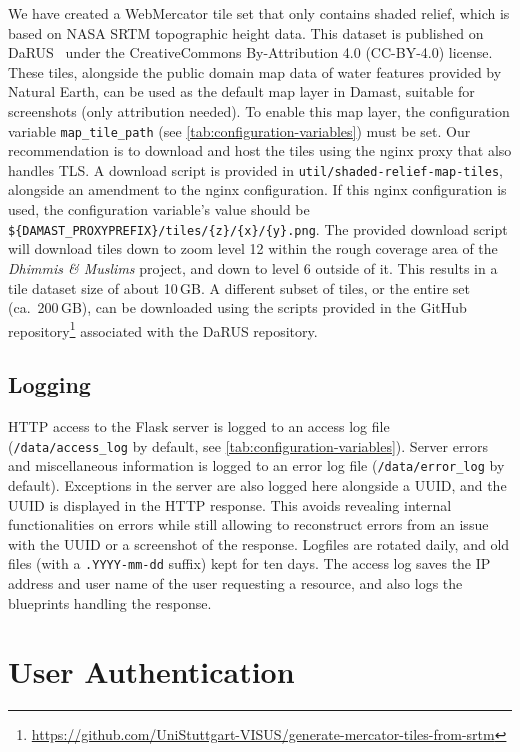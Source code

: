 We have created a WebMercator tile set that only contains shaded relief, which is based on NASA SRTM topographic height data.
This dataset is published on DaRUS~\cite{SRTM-tiles} under the CreativeCommons By-Attribution 4.0 (CC-BY-4.0) license.
These tiles, alongside the public domain map data of water features provided by Natural Earth, can be used as the default map layer in Damast, suitable for screenshots (only attribution needed).
To enable this map layer, the configuration variable \verb!map_tile_path! (see \cref{tab:configuration-variables}) must be set.
Our recommendation is to download and host the tiles using the nginx proxy that also handles TLS.
A download script is provided in \verb!util/shaded-relief-map-tiles!, alongside an amendment to the nginx configuration.
If this nginx configuration is used, the configuration variable's value should be \verb!${DAMAST_PROXYPREFIX}/tiles/{z}/{x}/{y}.png!.
The provided download script will download tiles down to zoom level 12 within the rough coverage area of the \emph{Dhimmis \& Muslims} project, and down to level 6 outside of it.
This results in a tile dataset size of about 10\,GB.
A different subset of tiles, or the entire set (ca.\ 200\,GB), can be downloaded using the scripts provided in the GitHub repository\footnote{\url{https://github.com/UniStuttgart-VISUS/generate-mercator-tiles-from-srtm}} associated with the DaRUS repository.


\subsection{Logging}
\label{sec:logging}

HTTP access to the Flask server is logged to an access log file (\verb!/data/access_log! by default, see \cref{tab:configuration-variables}).
Server errors and miscellaneous information is logged to an error log file (\verb!/data/error_log! by default).
Exceptions in the server are also logged here alongside a UUID, and the UUID is displayed in the HTTP response.
This avoids revealing internal functionalities on errors while still allowing to reconstruct errors from an issue with the UUID or a screenshot of the response.
Logfiles are rotated daily, and old files (with a \verb!.YYYY-mm-dd! suffix) kept for ten days.
The access log saves the IP address and user name of the user requesting a resource, and also logs the blueprints handling the response.


\section{User Authentication}
\label{sec:user-authentication}

